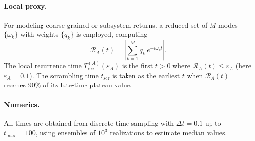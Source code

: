 \documentclass[12pt]{article}
\newcommand{\TrecA}{T^{(A)}_{\text{rec}}}
\newcommand{\tscr}{t_{\text{scr}}}
\theoremstyle{remark}
\begin{document}
\paragraph{Local proxy.}
For modeling coarse-grained or subsystem returns, a reduced set of $M$ modes $\{\omega_k\}$ with weights $\{q_k\}$ is employed, computing
\[
\mathcal{R}_A(t) = \left| \sum_{k=1}^M q_k \, e^{-i \omega_k t} \right| .
\]
The local recurrence time $\TrecA(\varepsilon_A)$ is the first $t>0$ where $\mathcal{R}_A(t) \leq \varepsilon_A$ (here $\varepsilon_A = 0.1$).
The scrambling time $\tscr$ is taken as the earliest $t$ when $\mathcal{R}_A(t)$ reaches $90\%$ of its late-time plateau value.

\paragraph{Numerics.}
All times are obtained from discrete time sampling with $\Delta t = 0.1$ up to $t_{\max} = 100$, using ensembles of $10^3$ realizations to estimate median values.
\end{document}
